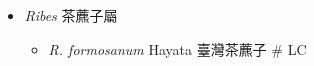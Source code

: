 
  \begin{itemize}
 \item[] \textit{Ribes} 茶藨子屬
                                
  \begin{itemize}
        \item[] \textit{R. formosanum} Hayata  臺灣茶藨子  \# LC
  \end{itemize}
  \end{itemize}
